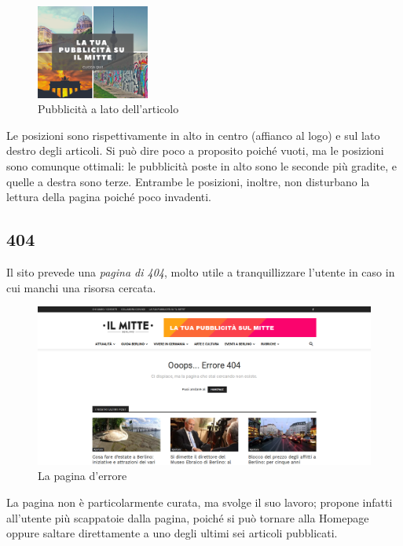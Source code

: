 \begin{figure}[htbp]
\begin{center}
\includegraphics[width=10em]{img/pubblicita2}
\caption{Pubblicità a lato dell'articolo}
\end{center}
\end{figure}
\vspace{30pt}

Le posizioni sono rispettivamente in alto in centro (affianco al logo) e sul lato destro degli articoli. Si può dire poco a proposito poiché vuoti, ma le posizioni sono comunque ottimali: le pubblicità poste in alto sono le seconde più gradite, e quelle a destra sono terze. Entrambe le posizioni, inoltre, non disturbano la lettura della pagina poiché poco invadenti.

\subsection{404}
Il sito prevede una \textit{pagina di 404}, molto utile a tranquillizzare l'utente in caso in cui manchi una risorsa cercata.

\vspace{30pt}
\begin{figure}[htbp]
\begin{center}
\includegraphics[width=35em]{img/404}
\caption{La pagina d'errore}
\end{center}
\end{figure}
\vspace{30pt}

La pagina non è particolarmente curata, ma svolge il suo lavoro; propone infatti all'utente più scappatoie dalla pagina, poiché si può tornare alla Homepage oppure saltare direttamente a uno degli ultimi sei articoli pubblicati.